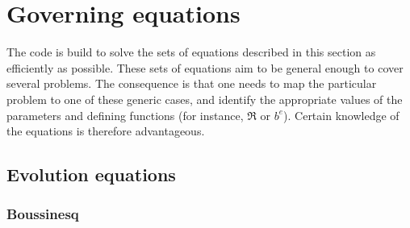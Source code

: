 \chapter{Governing equations}\label{sec:equations}

The code is build to solve the sets of equations described in this section as efficiently as possible. These sets of equations aim to be general enough to cover several problems. The consequence is that one needs to map the particular problem to one of these generic cases, and identify the appropriate values of the parameters and defining functions (for instance, $\Re$ or $b^e$). Certain knowledge of the equations is therefore advantageous.

\section{Evolution equations}

\subsection{Boussinesq}

